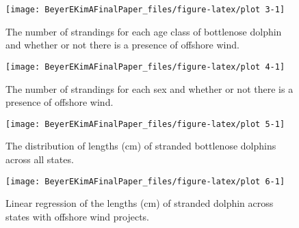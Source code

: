 \documentclass[
]{article}
\begin{document}
\begin{figure}

{\centering \texttt{[image: BeyerEKimAFinalPaper\_files/figure-latex/plot 3-1]} 

}

\caption{\label{fig:figs} The number of strandings for each age class of bottlenose dolphin and whether or not there is a presence of offshore wind.}\label{fig:plot 3}
\end{figure}

\begin{figure}

{\centering \texttt{[image: BeyerEKimAFinalPaper\_files/figure-latex/plot 4-1]} 

}

\caption{\label{fig:figs} The number of strandings for each sex and whether or not there is a presence of offshore wind.}\label{fig:plot 4}
\end{figure}

\begin{figure}

{\centering \texttt{[image: BeyerEKimAFinalPaper\_files/figure-latex/plot 5-1]} 

}

\caption{\label{fig:figs} The distribution of lengths (cm) of stranded bottlenose dolphins across all states.}\label{fig:plot 5}
\end{figure}

\begin{figure}

{\centering \texttt{[image: BeyerEKimAFinalPaper\_files/figure-latex/plot 6-1]} 

}

\caption{\label{fig:figs} Linear regression of the lengths (cm) of stranded dolphin across states with offshore wind projects.}\label{fig:plot 6}
\end{figure}
\end{document}
